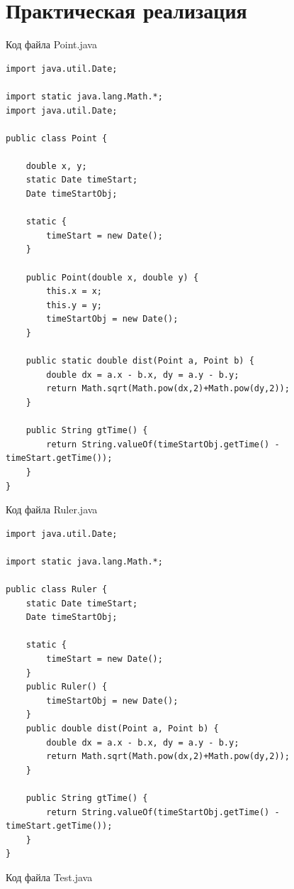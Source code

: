 \documentclass[a4paper, 14pt]{extarticle}
\begin{document}
\section{Практическая реализация}
Код файла Point.java
\begin{lstlisting}
import java.util.Date;

import static java.lang.Math.*;
import java.util.Date;

public class Point {

    double x, y;
    static Date timeStart;
    Date timeStartObj;

    static {
        timeStart = new Date();
    }

    public Point(double x, double y) {
        this.x = x;
        this.y = y;
        timeStartObj = new Date();
    }

    public static double dist(Point a, Point b) {
        double dx = a.x - b.x, dy = a.y - b.y;
        return Math.sqrt(Math.pow(dx,2)+Math.pow(dy,2));
    }

    public String gtTime() {
        return String.valueOf(timeStartObj.getTime() - timeStart.getTime());
    }
}
\end{lstlisting}
\par
Код файла Ruler.java
\begin{lstlisting}
import java.util.Date;

import static java.lang.Math.*;

public class Ruler {
    static Date timeStart;
    Date timeStartObj;

    static {
        timeStart = new Date();
    }
    public Ruler() {
        timeStartObj = new Date();
    }
    public double dist(Point a, Point b) {
        double dx = a.x - b.x, dy = a.y - b.y;
        return Math.sqrt(Math.pow(dx,2)+Math.pow(dy,2));
    }

    public String gtTime() {
        return String.valueOf(timeStartObj.getTime() - timeStart.getTime());
    }
}
\end{lstlisting}
\par
Код файла Test.java
\end{document}
